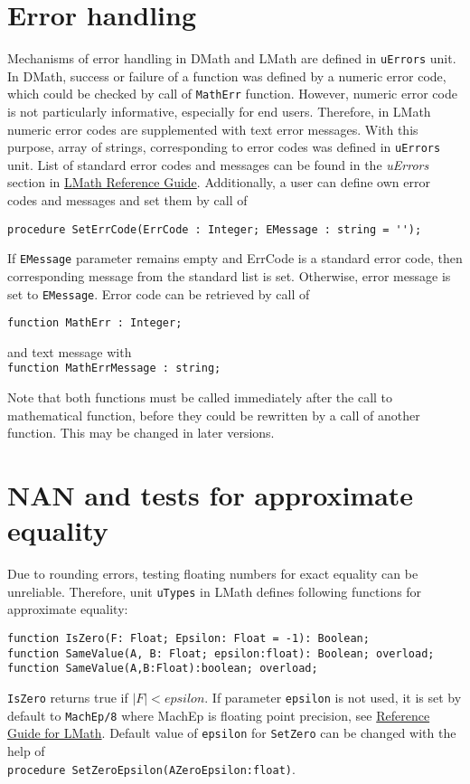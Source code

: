 \documentclass[12pt,a4paper,oneside]{article}
\newcommand{\code}[1]{\texttt{#1}}
\begin{document}
\section{Error handling}
Mechanisms of error handling in DMath and LMath are defined in \code{uErrors} unit. In DMath, success or failure of a function was defined by a numeric error code, which could be checked by call of \code{MathErr} function.
However, numeric error code is not particularly informative, especially for end users. Therefore, in LMath numeric error codes are supplemented with text error messages. With this purpose, array of strings, corresponding to error codes was defined in \code{uErrors} unit. List of standard error codes and messages can be found in the \textit{uErrors} section in \hyperref{file:LMath05.pdf}{}{}{LMath Reference Guide}. Additionally, a user can define own error codes and messages and set them by call of
\begin{verbatim}
procedure SetErrCode(ErrCode : Integer; EMessage : string = '');
\end{verbatim}
If \code{EMessage} parameter remains empty and ErrCode is a standard error code, then corresponding message from the standard list is set. Otherwise, error message is set to \code{EMessage}. Error code can be retrieved by call of
\begin{verbatim}
function MathErr : Integer;
\end{verbatim}
and text message with\\
\code{function MathErrMessage : string;}

\noindent Note that both functions must be called immediately after the call to mathematical function, before they could be rewritten by a call of another function. This may be changed in later versions.
\section{NAN and tests for approximate equality}
Due to rounding errors, testing floating numbers for exact equality can be unreliable. Therefore, unit \code{uTypes} in LMath defines following functions for approximate equality:
\begin{verbatim}
function IsZero(F: Float; Epsilon: Float = -1): Boolean;
function SameValue(A, B: Float; epsilon:float): Boolean; overload;
function SameValue(A,B:Float):boolean; overload;
\end{verbatim}
\code{IsZero} returns true if $\left| F \right| < epsilon$. If parameter \code{epsilon} is not used, it is set by default to \code{MachEp/8} where MachEp is floating point precision, see \hyperref{file:LMath05.pdf}{}{}{Reference Guide for LMath}. Default value of \code{epsilon} for \code{SetZero} can be changed with the help of \\
\code{procedure SetZeroEpsilon(AZeroEpsilon:float)}.
\end{document}
